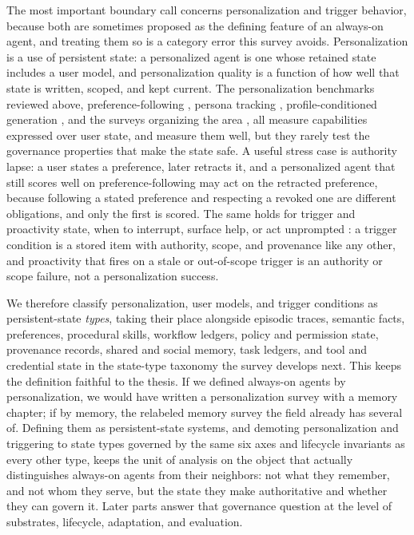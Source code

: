 The most important boundary call concerns personalization and trigger behavior, because both are sometimes proposed as the defining feature of an always-on agent, and treating them so is a category error this survey avoids. Personalization is a use of persistent state: a personalized agent is one whose retained state includes a user model, and personalization quality is a function of how well that state is written, scoped, and kept current. The personalization benchmarks reviewed above, preference-following \citep{zhao2025prefeval}, persona tracking \citep{jiang2025personamem}, profile-conditioned generation \citep{salemi-etal-2024-lamp}, and the surveys organizing the area \citep{xu2026personalizedllmpoweredagentsfoundations}, all measure capabilities expressed over user state, and measure them well, but they rarely test the governance properties that make the state safe. A useful stress case is authority lapse: a user states a preference, later retracts it, and a personalized agent that still scores well on preference-following may act on the retracted preference, because following a stated preference and respecting a revoked one are different obligations, and only the first is scored. The same holds for trigger and proactivity state, when to interrupt, surface help, or act unprompted \citep{lu2024proactiveagent,he2024madialbench}: a trigger condition is a stored item with authority, scope, and provenance like any other, and proactivity that fires on a stale or out-of-scope trigger is an authority or scope failure, not a personalization success.

We therefore classify personalization, user models, and trigger conditions as persistent-state \emph{types}, taking their place alongside episodic traces, semantic facts, preferences, procedural skills, workflow ledgers, policy and permission state, provenance records, shared and social memory, task ledgers, and tool and credential state in the state-type taxonomy the survey develops next. This keeps the definition faithful to the thesis. If we defined always-on agents by personalization, we would have written a personalization survey with a memory chapter; if by memory, the relabeled memory survey the field already has several of. Defining them as persistent-state systems, and demoting personalization and triggering to state types governed by the same six axes and lifecycle invariants as every other type, keeps the unit of analysis on the object that actually distinguishes always-on agents from their neighbors: not what they remember, and not whom they serve, but the state they make authoritative and whether they can govern it. Later parts answer that governance question at the level of substrates, lifecycle, adaptation, and evaluation.
